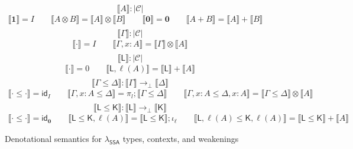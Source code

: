 \documentclass[acmsmall,screen,review]{acmart}
\newcommand{\mc}[1]{\ensuremath{\mathcal{#1}}}
\newcommand{\mb}[1]{\ensuremath{\mathbf{#1}}}
\newcommand{\ms}[1]{\ensuremath{\mathsf{#1}}}
\newcommand{\bhyp}[2]{#1 : #2}
\newcommand{\lhyp}[2]{#1(#2)}
\newcommand{\dnt}[1]{\llbracket{#1}\rrbracket}
\newcommand{\isotopessa}{\(\lambda_{\ms{SSA}}\)}
\begin{document}
\begin{figure}
  \begin{equation*}
    \boxed{\dnt{A} : |\mc{C}|}
  \end{equation*}
  \begin{align*}
     \dnt{\mb{1}} = I \qquad
      \dnt{A \otimes B} = \dnt{A} \otimes \dnt{B} \qquad
      \dnt{\mb{0}} = \mb{0} \qquad
      \dnt{A + B} = \dnt{A} + \dnt{B} \\
  \end{align*}
  \begin{equation*}
    \boxed{\dnt{\Gamma} : |\mc{C}|}
  \end{equation*}
  \begin{align*}
    \dnt{\cdot} = I \qquad
      \dnt{\Gamma, \bhyp{x}{A}} = \dnt{\Gamma} \otimes \dnt{A} \\
  \end{align*}
  \begin{equation*}
    \boxed{\dnt{\ms{L}} : |\mc{C}|}
  \end{equation*}
  \begin{align*}
      \dnt{\cdot} = 0 \qquad
      \dnt{\ms{L}, \lhyp{\ell}{A}} = \dnt{\ms{L}} + \dnt{A} \\
  \end{align*}
  \begin{equation*}
    \boxed{\dnt{\Gamma \leq \Delta} : \dnt{\Gamma} \to_\bot \dnt{\Delta}}
  \end{equation*}
  \begin{gather*}
    \dnt{\cdot \leq \cdot} = \ms{id}_I \qquad
    \dnt{\Gamma, \bhyp{x}{A} \leq \Delta} = \pi_l;\dnt{\Gamma \leq \Delta} \qquad
    \dnt{\Gamma, \bhyp{x}{A} \leq \Delta, \bhyp{x}{A}}
    = \dnt{\Gamma \leq \Delta} \otimes \dnt{A} \\
  \end{gather*}
  \begin{equation*}
    \boxed{\dnt{\ms{L} \leq \ms{K}} : \dnt{\ms{L}} \to_\bot \dnt{\ms{K}}}
  \end{equation*}
  \begin{gather*}
    \dnt{\cdot \leq \cdot} = \ms{id}_{\mb{0}} \qquad
    \dnt{\ms{L} \leq \ms{K}, \lhyp{\ell}{A}} = \dnt{\ms{L} \leq \ms{K}};\iota_\ell \qquad
    \dnt{\ms{L}, \lhyp{\ell}{A} \leq \ms{K}, \lhyp{\ell}{A}}
    = \dnt{\ms{L} \leq \ms{K}} + \dnt{A}
  \end{gather*}
  \caption{Denotational semantics for \isotopessa{} types, contexts, and weakenings}
  \Description{}
  \label{fig:ssa-ty-sem}
\end{figure}
\end{document}
